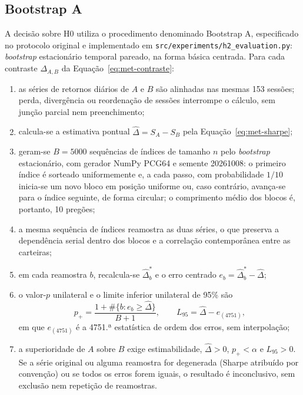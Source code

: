 \subsection{Bootstrap A}

A decisão sobre H0 utiliza o procedimento denominado Bootstrap A, especificado no protocolo original e implementado em \texttt{src/experiments/h2\_evaluation.py}: \textit{bootstrap} estacionário temporal pareado, na forma básica centrada. Para cada contraste $\Delta_{A,B}$ da Equação~\eqref{eq:met-contraste}:

\begin{enumerate}
    \item as séries de retornos diários de $A$ e $B$ são alinhadas nas mesmas 153 sessões; perda, divergência ou reordenação de sessões interrompe o cálculo, sem junção parcial nem preenchimento;
    \item calcula-se a estimativa pontual $\hat{\Delta} = S_A - S_B$ pela Equação~\eqref{eq:met-sharpe};
    \item geram-se $B = 5000$ sequências de índices de tamanho $n$ pelo \textit{bootstrap} estacionário, com gerador NumPy PCG64 e semente 20261008: o primeiro índice é sorteado uniformemente e, a cada passo, com probabilidade $1/10$ inicia-se um novo bloco em posição uniforme ou, caso contrário, avança-se para o índice seguinte, de forma circular; o comprimento médio dos blocos é, portanto, 10 pregões;
    \item a mesma sequência de índices reamostra as duas séries, o que preserva a dependência serial dentro dos blocos e a correlação contemporânea entre as carteiras;
    \item em cada reamostra $b$, recalcula-se $\hat{\Delta}^{*}_{b}$ e o erro centrado $e_b = \hat{\Delta}^{*}_{b} - \hat{\Delta}$;
    \item o valor-$p$ unilateral e o limite inferior unilateral de 95\% são
    \begin{equation}
    p_{+} = \frac{1 + \#\{b : e_b \geq \hat{\Delta}\}}{B + 1}, \qquad L_{95} = \hat{\Delta} - e_{(4751)},
    \label{eq:met-bootstrap}
    \end{equation}
    em que $e_{(4751)}$ é a 4751.ª estatística de ordem dos erros, sem interpolação;
    \item a superioridade de $A$ sobre $B$ exige estimabilidade, $\hat{\Delta} > 0$, $p_{+} < \alpha$ e $L_{95} > 0$. Se a série original ou alguma reamostra for degenerada (Sharpe atribuído por convenção) ou se todos os erros forem iguais, o resultado é inconclusivo, sem exclusão nem repetição de reamostras.
\end{enumerate}

